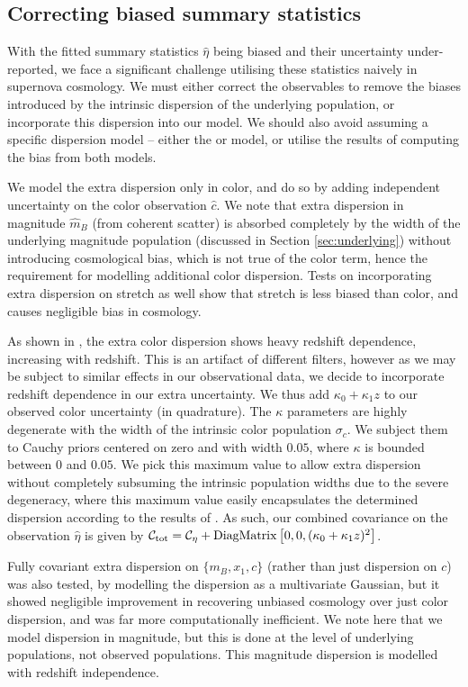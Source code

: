 \documentclass[twocolumn,trackchanges,tighten]{aastex62}
\newcommand{\gten}{\citetalias{Guy2010}}
\newcommand{\celeven}{\citetalias{Chotard2011}}
\begin{document}
\subsection{Correcting biased summary statistics}

With the fitted summary statistics $\hat{\eta}$ being biased and their uncertainty under-reported, we face a significant challenge utilising these statistics naively in supernova cosmology. We must either correct the observables to remove the biases introduced by the intrinsic dispersion of the underlying population, or incorporate this dispersion into our model. We should also avoid assuming a specific dispersion model -- either the {\gten} or {\celeven} model, or utilise the results of computing the bias from both models.

We model the extra dispersion only in color, and do so by adding independent uncertainty on the color observation $\hat{c}$. We note that extra dispersion in magnitude $\hat{m}_B$ (from coherent scatter) is absorbed completely by the width of the underlying magnitude population (discussed in Section \ref{sec:underlying}) without introducing cosmological bias, which is not true of the color term, hence the requirement for modelling additional color dispersion. Tests on incorporating extra dispersion on stretch as well show that stretch is less biased than color, and causes negligible bias in cosmology.

As shown in \citep{Kessler2013}, the extra color dispersion shows heavy redshift dependence, increasing with redshift. This is an artifact of different filters, however as we may be subject to similar effects in our observational data, we decide to incorporate redshift dependence in our extra uncertainty. We thus add $\kappa_0 + \kappa_1 z$ to our observed color uncertainty (in quadrature). The $\kappa$ parameters are highly degenerate with the width of the intrinsic color population $\sigma_c$. We subject them to Cauchy priors centered on zero and with width $0.05$, where $\kappa$ is bounded between $0$ and $0.05$. We pick this maximum value to allow extra dispersion without completely subsuming the intrinsic population widths due to the severe degeneracy, where this maximum value easily encapsulates the determined dispersion according to the results of \citet{Kessler2013}. As such, our combined covariance on the observation $\hat{\eta}$ is given by $\mathcal{C}_{\rm tot} = \mathcal{C_\eta} + {\rm DiagMatrix}\left[0, 0, (\kappa_0 + \kappa_1 z)^2\right]$. 

Fully covariant extra dispersion on $\lbrace m_B, x_1, c \rbrace$ (rather than just dispersion on $c$) was also tested, by modelling the dispersion as a multivariate Gaussian, but it showed negligible improvement in recovering unbiased cosmology over just color dispersion, and was far more computationally inefficient. We note here that we model dispersion in magnitude, but this is done at the level of underlying populations, not observed populations. This magnitude dispersion is modelled with redshift independence.
\end{document}
